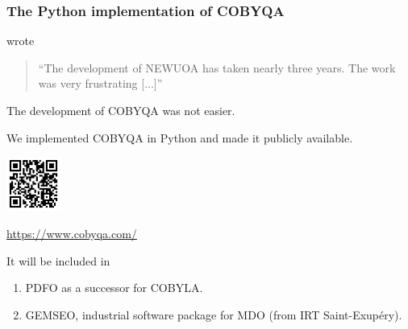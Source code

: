 \documentclass{polyu-presentation}
\begin{document}
\begin{frame}
    \frametitle{The Python implementation of COBYQA}

    \begin{block}{}
        \textcite{Powell_2006} wrote
        \begin{quote}
            \enquote{The development of NEWUOA has taken nearly \alert{three years}. The work was very \alert{frustrating} [...]}
        \end{quote}
        The development of COBYQA was \alert{not easier}.
    \end{block}

    We implemented COBYQA in \alert{Python} and made it \alert{publicly available}.
    
	\begin{center}
        \href{https://www.cobyqa.com/}{\includegraphics[width=0.7in]{images/qr/cobyqa.png}}

        \scriptsize\url{https://www.cobyqa.com/}
    \end{center}

    It will be included in
    \begin{enumerate}
        \item PDFO as a successor for COBYLA.
        \item GEMSEO, \alert{industrial} software package for \alert{MDO} (from IRT Saint-Exup{\'{e}}ry).
    \end{enumerate}
\end{frame}
\end{document}

